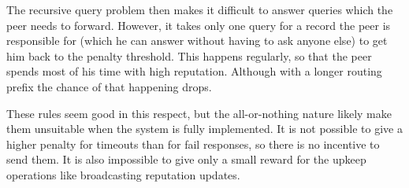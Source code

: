 The recursive query problem then makes it difficult to answer queries which the
peer needs to forward. However, it takes only one query for a record the peer is
responsible for (which he can answer without having to ask anyone else) to get
him back to the penalty threshold. This happens regularly, so that the peer
spends most of his time with high reputation. Although with a longer routing
prefix the chance of that happening drops.

These rules seem good in this respect, but the all-or-nothing nature likely make
them unsuitable when the system is fully implemented. It is not possible to give
a higher penalty for timeouts than for fail responses, so there is no incentive
to send them. It is also impossible to give only a small reward for the upkeep
operations like broadcasting reputation updates.
